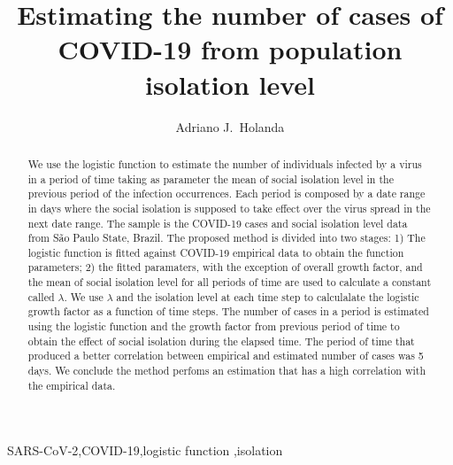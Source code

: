 \documentclass[review]{elsarticle}
\begin{document}
\begin{frontmatter}

\title{Estimating the number of cases of {COVID-19} from population isolation level}

\author[mymainaddress,mysecondaryaddress]{Adriano J.\ Holanda}

\address[mymainaddress]{Department of Computing and Mathematics - Faculty of Philosophy, Science and Letters at Ribeir\~{a}o Preto - University of S\~{a}o Paulo, Ribeirão Preto, S\~{a}o Paulo, Brazil}
\address[mysecondaryaddress]{Faculty ``Dr.\ Francisco Maeda'', Ituverava, S\~{a}o Paulo, Brazil}


\begin{abstract}
We use the logistic function to estimate the number 
of individuals infected by a virus in a period of time
taking as parameter the mean of social isolation level 
in the previous period of the infection occurrences.
Each period is composed by a date range in days 
where the social isolation is supposed to take
effect over the virus spread in the next 
date range.
The sample is the \hbox{COVID-19} cases and 
social isolation level data from S\~{a}o Paulo State, Brazil.  
The proposed method is divided into two stages: 
1) The logistic function is fitted against \hbox{COVID-19}
empirical data to obtain the function parameters; 
2) the fitted paramaters, 
with the exception of overall growth factor,
 and the mean of social isolation level for all periods of time 
are used to calculate a constant called $\lambda$.
We use $\lambda$ and the isolation level at each 
time step to calculalate the logistic growth factor 
as a function of time steps.
 The number of cases in a period is estimated using 
the logistic function and the growth factor 
from previous period of time 
to obtain the effect of social isolation during the
elapsed time. 
The period of time that produced a 
better correlation between empirical and estimated 
number of cases was 5 days. 
We conclude the method perfoms an estimation that has 
a high correlation with the empirical data.
\end{abstract}

\begin{keyword}
\hbox{SARS-CoV-2}\sep \hbox{COVID-19}\sep logistic function \sep isolation
\end{keyword}

\end{frontmatter}
\end{document}
